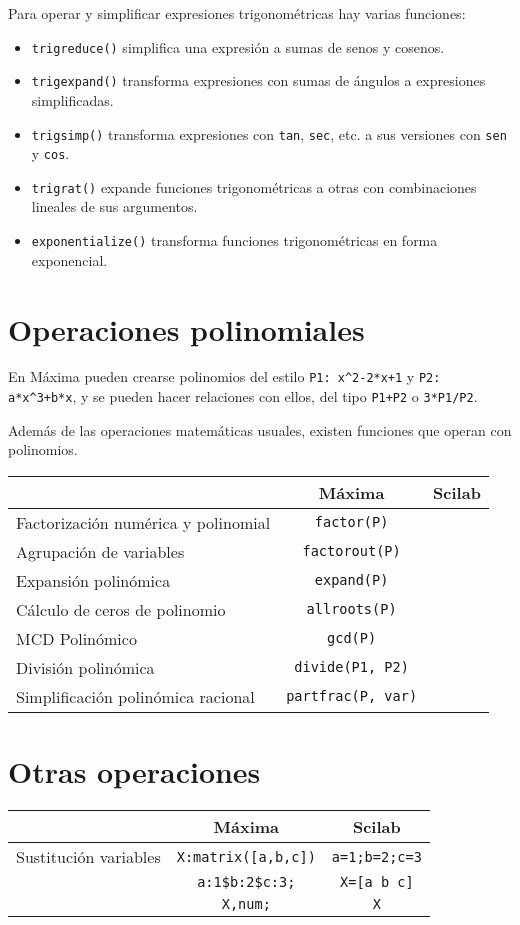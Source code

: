 \documentclass[a4paper]{article}
\begin{document}
Para operar y simplificar expresiones trigonométricas hay varias funciones:
\begin{itemize}
	\item \verb|trigreduce()| simplifica una expresión a sumas de senos y cosenos.
	\item \verb|trigexpand()| transforma expresiones con sumas de ángulos a expresiones simplificadas.
	\item \verb|trigsimp()| transforma expresiones con \verb|tan|, \verb|sec|, etc. a sus versiones con \verb|sen| y \verb|cos|.
	\item \verb|trigrat()| expande funciones trigonométricas a otras con combinaciones lineales de sus argumentos.
	\item \verb|exponentialize()| transforma funciones trigonométricas en forma exponencial.
\end{itemize}

\raggedright
\section{Operaciones polinomiales}
En Máxima pueden crearse polinomios del estilo \verb|P1: x^2-2*x+1| y \verb|P2: a*x^3+b*x|, y se pueden hacer relaciones con ellos, del tipo \verb|P1+P2| o \verb|3*P1/P2|. 

Además de las operaciones matemáticas usuales, existen funciones que operan con polinomios.

\centering

\begin{tabular}{lcc}
	& Máxima & Scilab \\ \midrule
	Factorización numérica y polinomial & \verb|factor(P)| & \\
	Agrupación de variables & \verb|factorout(P)| &\\
	Expansión polinómica & \verb|expand(P)| & \\
	Cálculo de ceros de polinomio & \verb|allroots(P)| & \\
	MCD Polinómico & \verb|gcd(P)| & \\
	División polinómica & \verb|divide(P1, P2)| & \\
	Simplificación polinómica racional & \verb|partfrac(P, var)| & \\
\end{tabular}


\raggedright
\section{Otras operaciones}
\centering
\begin{tabular}{lcc}
	& Máxima & Scilab \\ \midrule
	Sustitución variables & \verb|X:matrix([a,b,c])| & 	 \verb|a=1;b=2;c=3|\\
& \verb|a:1$b:2$c:3;| &  \verb|X=[a b c]|	 \\
& \verb|X,num;| & \verb|X|	 \\
\end{tabular}
\end{document}
